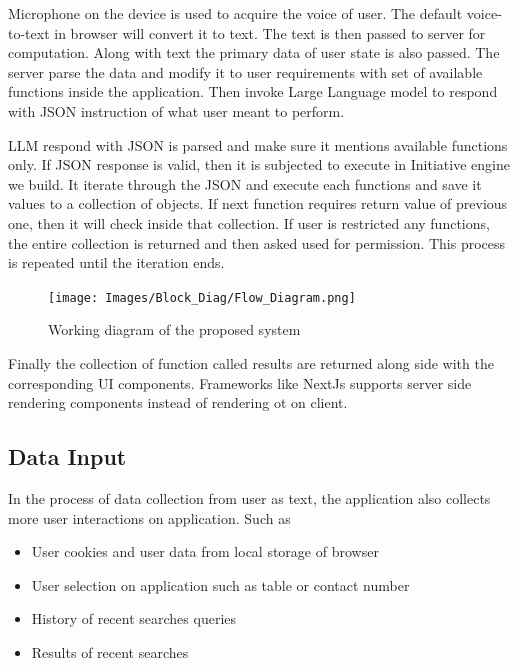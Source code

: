\noindent Microphone on the device is used to acquire the voice of user. The default voice-to-text in browser will convert it to text. The text is then passed to server for computation. Along with text the primary data of user state is also passed. The server parse the data and modify it to user requirements with set of available functions inside the application. Then invoke Large Language model to respond with JSON instruction of what user meant to perform.\\

\vspace{2 mm}

\noindent LLM respond with JSON is parsed and make sure it mentions available functions only. If JSON response is valid, then it is subjected to execute in Initiative engine we build. It iterate through the JSON and execute each functions and save it values to a collection of objects. If next function requires return value of previous one, then it will check inside that collection. If user is restricted any functions, the entire collection is returned and then asked used for permission. This process is repeated until the iteration ends.

\vspace{2 mm}


\begin{figure}[h!]
    \centering
    \texttt{[image: Images/Block\_Diag/Flow\_Diagram.png]}
    \caption{Working diagram of the proposed system}
\end{figure}

\noindent Finally the collection of function called results are returned along side with the corresponding UI components. Frameworks like NextJs supports server side rendering components instead of rendering ot on client.

\subsection{Data Input}

\noindent In the process of data collection from user as text, the application also collects more user interactions on application. Such as
\begin{itemize} 
    \item User cookies and user data from local storage of browser
    \item User selection on application such as table or contact number
    \item History of recent searches queries 
    \item Results of recent searches
\end{itemize}

